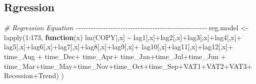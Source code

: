 \documentclass[
]{article}
\newenvironment{Shaded}{\begin{snugshade}}{\end{snugshade}}
\newcommand{\CommentTok}[1]{\textcolor[rgb]{0.56,0.35,0.01}{\textit{#1}}}
\newcommand{\ControlFlowTok}[1]{\textcolor[rgb]{0.13,0.29,0.53}{\textbf{#1}}}
\newcommand{\DecValTok}[1]{\textcolor[rgb]{0.00,0.00,0.81}{#1}}
\newcommand{\FunctionTok}[1]{\textcolor[rgb]{0.00,0.00,0.00}{#1}}
\newcommand{\NormalTok}[1]{#1}
\newcommand{\OtherTok}[1]{\textcolor[rgb]{0.56,0.35,0.01}{#1}}
\newcommand{\SpecialCharTok}[1]{\textcolor[rgb]{0.00,0.00,0.00}{#1}}
\begin{document}
\hypertarget{rgression}{%
\subsection{Rgression}\label{rgression}}

\begin{Shaded}
\begin{Highlighting}[]
\CommentTok{\# Regression Equation {-}{-}{-}{-}{-}{-}{-}{-}{-}{-}{-}{-}{-}{-}{-}{-}{-}{-}{-}{-}{-}{-}{-}{-}{-}{-}{-}{-}{-}{-}{-}{-}{-}{-}{-}{-}{-}{-}{-}{-}{-}{-}{-}{-}{-}{-}{-}{-}{-}{-}{-}{-}{-}}
\NormalTok{reg.model }\OtherTok{\textless{}{-}} \FunctionTok{lapply}\NormalTok{(}\DecValTok{1}\SpecialCharTok{:}\DecValTok{173}\NormalTok{, }\ControlFlowTok{function}\NormalTok{(x) }\FunctionTok{lm}\NormalTok{(COPY[,x] }\SpecialCharTok{\textasciitilde{}}\NormalTok{ lag1[,x]}\SpecialCharTok{+}\NormalTok{lag2[,x]}\SpecialCharTok{+}\NormalTok{lag3[,x]}\SpecialCharTok{+}\NormalTok{lag4[,x]}\SpecialCharTok{+}
\NormalTok{                                            lag5[,x]}\SpecialCharTok{+}\NormalTok{lag6[,x]}\SpecialCharTok{+}\NormalTok{lag7[,x]}\SpecialCharTok{+}\NormalTok{lag8[,x]}\SpecialCharTok{+}\NormalTok{lag9[,x]}\SpecialCharTok{+}
\NormalTok{                                            lag10[,x]}\SpecialCharTok{+}\NormalTok{lag11[,x]}\SpecialCharTok{+}\NormalTok{lag12[,x]}\SpecialCharTok{+}\NormalTok{ time\_Aug }\SpecialCharTok{+} 
\NormalTok{                                            time\_Dec}\SpecialCharTok{+}\NormalTok{ time\_Apr}\SpecialCharTok{+}\NormalTok{ time\_Jan}\SpecialCharTok{+}\NormalTok{time\_Jul}\SpecialCharTok{+}\NormalTok{time\_Jun }\SpecialCharTok{+}
\NormalTok{                                            time\_Mar}\SpecialCharTok{+}\NormalTok{time\_May}\SpecialCharTok{+}\NormalTok{time\_Nov}\SpecialCharTok{+}\NormalTok{time\_Oct}\SpecialCharTok{+}\NormalTok{time\_Sep}\SpecialCharTok{+}\NormalTok{VAT1}\SpecialCharTok{+}\NormalTok{VAT2}\SpecialCharTok{+}\NormalTok{VAT3}\SpecialCharTok{+}\NormalTok{Recession}\SpecialCharTok{+}\NormalTok{Trend)}
\NormalTok{)}


\end{Highlighting}
\end{Shaded}
\end{document}
